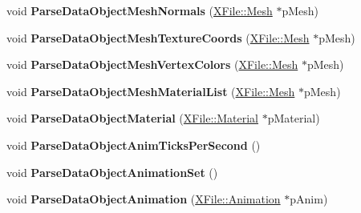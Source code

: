 \begin{DoxyCompactItemize}
\item 
\hypertarget{class_assimp_1_1_x_file_parser_ac2fb5ccbf5bd64a4146532b1fca07cc6}{void {\bfseries Parse\+Data\+Object\+Mesh\+Normals} (\hyperlink{struct_assimp_1_1_x_file_1_1_mesh}{X\+File\+::\+Mesh} $\ast$p\+Mesh)}\label{class_assimp_1_1_x_file_parser_ac2fb5ccbf5bd64a4146532b1fca07cc6}

\item 
\hypertarget{class_assimp_1_1_x_file_parser_a57e209546902cd44347975952adf53bb}{void {\bfseries Parse\+Data\+Object\+Mesh\+Texture\+Coords} (\hyperlink{struct_assimp_1_1_x_file_1_1_mesh}{X\+File\+::\+Mesh} $\ast$p\+Mesh)}\label{class_assimp_1_1_x_file_parser_a57e209546902cd44347975952adf53bb}

\item 
\hypertarget{class_assimp_1_1_x_file_parser_ae3c5517db091abb595423e34cd56a57f}{void {\bfseries Parse\+Data\+Object\+Mesh\+Vertex\+Colors} (\hyperlink{struct_assimp_1_1_x_file_1_1_mesh}{X\+File\+::\+Mesh} $\ast$p\+Mesh)}\label{class_assimp_1_1_x_file_parser_ae3c5517db091abb595423e34cd56a57f}

\item 
\hypertarget{class_assimp_1_1_x_file_parser_aba7d085746ba8fd3b6a8364396798865}{void {\bfseries Parse\+Data\+Object\+Mesh\+Material\+List} (\hyperlink{struct_assimp_1_1_x_file_1_1_mesh}{X\+File\+::\+Mesh} $\ast$p\+Mesh)}\label{class_assimp_1_1_x_file_parser_aba7d085746ba8fd3b6a8364396798865}

\item 
\hypertarget{class_assimp_1_1_x_file_parser_ad227c498d8aa95cb2b82db5b98b13478}{void {\bfseries Parse\+Data\+Object\+Material} (\hyperlink{struct_assimp_1_1_x_file_1_1_material}{X\+File\+::\+Material} $\ast$p\+Material)}\label{class_assimp_1_1_x_file_parser_ad227c498d8aa95cb2b82db5b98b13478}

\item 
\hypertarget{class_assimp_1_1_x_file_parser_ae0877e929feefef668e88c3adccfd759}{void {\bfseries Parse\+Data\+Object\+Anim\+Ticks\+Per\+Second} ()}\label{class_assimp_1_1_x_file_parser_ae0877e929feefef668e88c3adccfd759}

\item 
\hypertarget{class_assimp_1_1_x_file_parser_a75a8abb92551284e4bedb9eb58a2d592}{void {\bfseries Parse\+Data\+Object\+Animation\+Set} ()}\label{class_assimp_1_1_x_file_parser_a75a8abb92551284e4bedb9eb58a2d592}

\item 
\hypertarget{class_assimp_1_1_x_file_parser_af28a873050a5f79ca6e225e55ea899d7}{void {\bfseries Parse\+Data\+Object\+Animation} (\hyperlink{struct_assimp_1_1_x_file_1_1_animation}{X\+File\+::\+Animation} $\ast$p\+Anim)}\label{class_assimp_1_1_x_file_parser_af28a873050a5f79ca6e225e55ea899d7}


\end{DoxyCompactItemize}
